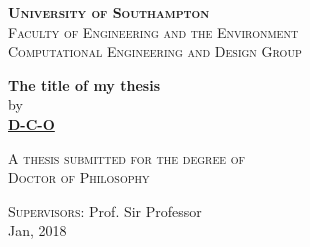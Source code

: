 
\begin{titlepage}
\thispagestyle{empty}

\begin{center}

  \textsc{\huge \textbf{University of Southampton}}~\\[0.5cm]
  \textsc{\large Faculty of Engineering and the Environment}~\\[0.5cm]
  \textsc{Computational Engineering and Design Group}
    
  \vspace{4.0cm}

  { \huge \textbf{The title of my thesis} \\[2cm] }
  by\\[0.5cm] 
    {\Large \href{mailto:someone@soton.ac.uk}{\color{black}\textbf{D-C-O}}}

  \vspace{2cm}
    
    \textsc{ {\large  A thesis submitted for the degree of} \\[0.5cm] 
             {\Large  Doctor of Philosophy}}

  \vspace{2cm}

  {\large\textsc{Supervisors:} Prof. Sir Professor} \\[0.5cm]
  {Jan, 2018}

\end{center}
\end{titlepage}
\restoregeometry
